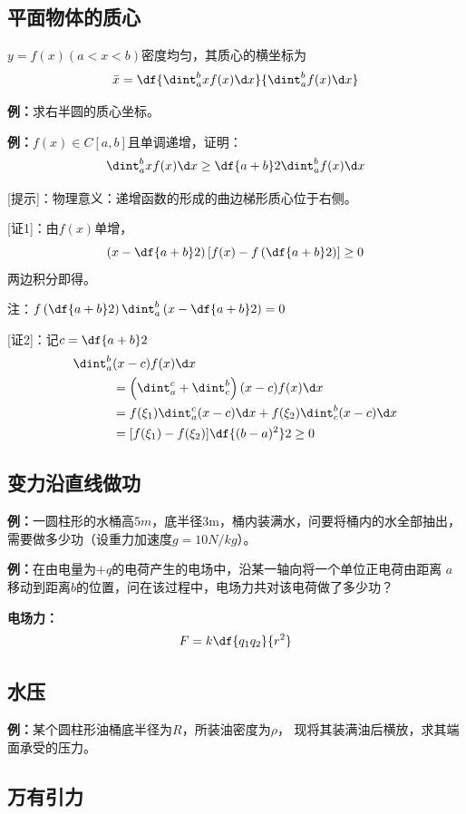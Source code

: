 \subsection{平面物体的质心}
$y=f(x)(a<x<b)$密度均匀，其质心的横坐标为
$$\bar{x}=\df{\dint_a^bxf(x)\d x}{\dint_a^bf(x)\d x}$$

{\bf 例：}求右半圆的质心坐标。

{\bf 例：}$f(x)\in C[a,b]$且单调递增，证明：
$$\dint_a^bxf(x)\d x\geq\df{a+b}2\dint_a^bf(x)\d x$$

[提示]：物理意义：递增函数的形成的曲边梯形质心位于右侧。

[证1]：由$f(x)$单增，
$$\left(x-\df{a+b}2\right)\left[f(x)-f\left(
\df{a+b}2\right)\right]\geq0$$
两边积分即得。
\fin

注：$f\left(\df{a+b}2\right)\dint_a^b\left(x-\df{a+b}2\right)=0$

[证2]：记$c=\df{a+b}2$
\begin{align}
	\dint_a^b&(x-c)f(x)\d x\notag\\
	&=\left(\dint_a^c+\dint_c^b\right)(x-c)f(x)\d x\notag\\
	&=f(\xi_1)\dint_a^c(x-c)\d x+f(\xi_2)\dint_c^b(x-c)\d x\notag\\
	&=[f(\xi_1)-f(\xi_2)]\df{(b-a)^2}2\geq0\notag
\end{align}
\fin

\subsection{变力沿直线做功}

{\bf 例：}一圆柱形的水桶高$5m$，底半径$3$m，桶内装满水，问要将桶内的水全部抽出，
需要做多少功（设重力加速度$g=10N/kg$）。

{\bf 例：}在由电量为$+q$的电荷产生的电场中，沿某一轴向将一个单位正电荷由距离
$a$移动到距离$b$的位置，问在该过程中，电场力共对该电荷做了多少功？

{\bf 电场力：}
$$F=k\df{q_1q_2}{r^2}$$

\subsection{水压}

{\bf 例：}某个圆柱形油桶底半径为$R$，所装油密度为$\rho$，
现将其装满油后横放，求其端面承受的压力。

\subsection{万有引力}

